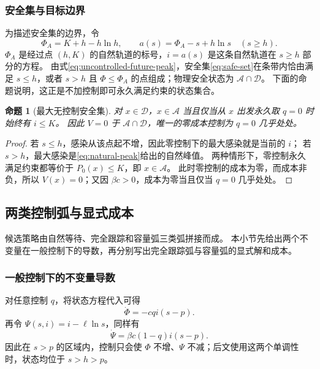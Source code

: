 \documentclass[11pt,a4paper,UTF8]{ctexart}
\newtheorem{proposition}[theorem]{命题}
\theoremstyle{definition}
\newcommand{\Acal}{\mathcal A}
\newcommand{\Dcal}{\mathcal D}
\begin{document}
\subsubsection{安全集与目标边界}
为描述安全集的边界，令
\begin{equation}
\Phi_A=K+h-h\ln h,\qquad
 a(s)=\Phi_A-s+h\ln s\quad(s\ge h).
\label{eq:safe-boundary}
\end{equation}
$\Phi_A$ 是经过点 $(h,K)$ 的自然轨道的标号，$i=a(s)$ 是这条自然轨道在 $s\ge h$ 部分的方程。
由式\eqref{eq:uncontrolled-future-peak}，安全集\eqref{eq:safe-set}在条带内恰由满足 $s\le h$，或者 $s>h$ 且 $\Phi\le\Phi_A$ 的点组成；物理安全状态为 $\Acal\cap\Dcal$。
下面的命题说明，这正是不加控制即可永久满足约束的状态集合。

\begin{proposition}[最大无控制安全集]
\label{prop:safe-exact}
对 $x\in\Dcal$，$x\in\Acal$ 当且仅当从 $x$ 出发永久取 $q=0$ 时始终有 $i\le K$。
因此 $V=0$ 于 $\Acal\cap\Dcal$，唯一的零成本控制为 $q=0$ 几乎处处。
\end{proposition}
\begin{proof}
若 $s\le h$，感染从该点起不增，因此零控制下的最大感染就是当前的 $i$；
若 $s>h$，最大感染是\eqref{eq:natural-peak}给出的自然峰值。
两种情形下，零控制永久满足约束都等价于 $P_0(x)\le K$，即 $x\in\Acal$。
此时零控制的成本为零，而成本非负，所以 $V(x)=0$；又因 $\beta c>0$，成本为零当且仅当 $q=0$ 几乎处处。
\end{proof}

\subsection{两类控制弧与显式成本}
\label{sec:arcs}
候选策略由自然等待、完全跟踪和容量弧三类弧拼接而成。
本小节先给出两个不变量在一般控制下的导数，再分别写出完全跟踪弧与容量弧的显式解和成本。

\subsubsection{一般控制下的不变量导数}
对任意控制 $q$，将状态方程代入可得
\begin{equation}
\boxed{\dot\Phi=-cqi(s-p).}
\label{eq:Phi-derivative}
\end{equation}
再令 $\Psi(s,i)=i-\ell\ln s$，同样有
\begin{equation}
\dot\Psi=\beta c(1-q)i(s-p).
\label{eq:Psi-derivative}
\end{equation}
因此在 $s>p$ 的区域内，控制只会使 $\Phi$ 不增、$\Psi$ 不减；后文使用这两个单调性时，状态均位于 $s>h>p$。
\end{document}
